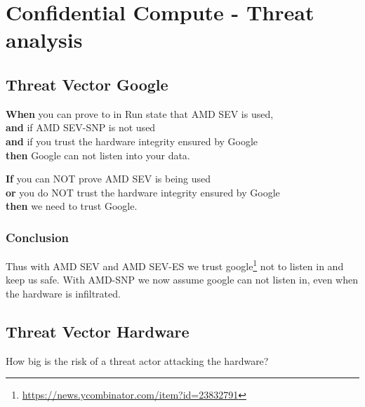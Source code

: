 
\section{Confidential Compute - Threat analysis}



\subsection{Threat Vector Google}
\textbf{When} you can prove to in Run state that AMD SEV is used,\\ 
\textbf{and} if AMD SEV-SNP is not used \\
\textbf{and} if you trust the hardware integrity ensured by Google \\
\textbf{then} Google can not listen into your data. 

\textbf{If} you can NOT prove AMD SEV is being used \\
\textbf{or} you do NOT trust the hardware integrity ensured by Google \\
\textbf{then} we need to trust Google.

\subsubsection*{Conclusion}

Thus with AMD SEV and AMD SEV-ES we trust 
google\footnote{\url{https://news.ycombinator.com/item?id=23832791}} 
not to listen in and keep us safe. 
With AMD-SNP we now assume google can not listen in, 
even when the hardware is infiltrated.

\subsection{Threat Vector Hardware}

How big is the risk of a threat actor attacking the hardware?

